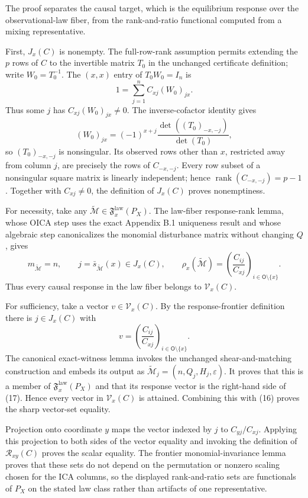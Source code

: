 The proof separates the causal target, which is the equilibrium response over the observational-law fiber, from the rank-and-ratio functional computed from a mixing representative.

First, \(J_x(C)\) is nonempty. The full-row-rank assumption permits extending the \(p\) rows of \(C\) to the invertible matrix \(T_0\) in the unchanged certificate definition; write \(W_0=T_0^{-1}\). The \((x,x)\) entry of \(T_0W_0=I_n\) is
\[
 1=\sum_{j=1}^n C_{xj}(W_0)_{jx}. \tag{14}
\]
Thus some \(j\) has \(C_{xj}(W_0)_{jx}\ne0\). The inverse-cofactor identity gives
\[
 (W_0)_{jx}=(-1)^{x+j}\frac{\det((T_0)_{-x,-j})}{\det(T_0)}, \tag{15}
\]
so \((T_0)_{-x,-j}\) is nonsingular. Its observed rows other than \(x\), restricted away from column \(j\), are precisely the rows of \(C_{-x,-j}\). Every row subset of a nonsingular square matrix is linearly independent; hence \(\operatorname{rank}(C_{-x,-j})=p-1\). Together with \(C_{xj}\ne0\), the definition of \(J_x(C)\) proves nonemptiness.

For necessity, take any \(\widetilde{\mathcal M}\in\mathfrak F_x^{\mathrm{law}}(P_X)\). The law-fiber response-rank lemma, whose OICA step uses the exact Appendix B.1 uniqueness result and whose algebraic step canonicalizes the monomial disturbance matrix without changing \(Q\), gives
\[
 m_{\widetilde{\mathcal M}}=n,
 \qquad
 j=\bar s_{\widetilde{\mathcal M}}(x)\in J_x(C),
 \qquad
 \rho_x(\widetilde{\mathcal M})
 =\left(\frac{C_{ij}}{C_{xj}}\right)_{i\in\mathsf O\setminus\{x\}}. \tag{16}
\]
Thus every causal response in the law fiber belongs to \(\mathcal V_x(C)\).

For sufficiency, take a vector \(v\in\mathcal V_x(C)\). By the response-frontier definition there is \(j\in J_x(C)\) with
\[
 v=\left(\frac{C_{ij}}{C_{xj}}\right)_{i\in\mathsf O\setminus\{x\}}. \tag{17}
\]
The canonical exact-witness lemma invokes the unchanged shear-and-matching construction and embeds its output as \(\widetilde{\mathcal M}_j=(n,Q_j,H_j,\varepsilon)\). It proves that this is a member of \(\mathfrak F_x^{\mathrm{law}}(P_X)\) and that its response vector is the right-hand side of (17). Hence every vector in \(\mathcal V_x(C)\) is attained. Combining this with (16) proves the sharp vector-set equality.

Projection onto coordinate \(y\) maps the vector indexed by \(j\) to \(C_{yj}/C_{xj}\). Applying this projection to both sides of the vector equality and invoking the definition of \(\mathcal R_{xy}(C)\) proves the scalar equality. The frontier monomial-invariance lemma proves that these sets do not depend on the permutation or nonzero scaling chosen for the ICA columns, so the displayed rank-and-ratio sets are functionals of \(P_X\) on the stated law class rather than artifacts of one representative.

